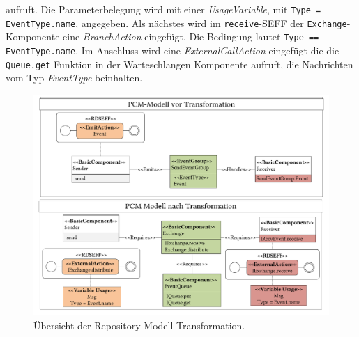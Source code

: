 aufruft. Die Parameterbelegung wird mit einer \emph{UsageVariable}, mit \texttt{Type = EventType.name}, angegeben. Als nächstes wird im \texttt{receive}-SEFF der \texttt{Exchange}-Komponente eine \emph{BranchAction} eingefügt. Die Bedingung lautet \texttt{Type == EventType.name}. Im Anschluss wird eine \emph{ExternalCallAction} eingefügt die die \texttt{Queue.get} Funktion in der Warteschlangen Komponente aufruft, die Nachrichten vom Typ \emph{EventType} beinhalten.

\begin{figure}
\center
  \includegraphics[width=1.3\textwidth, angle=90]{images/transformation/transformationRepository.pdf}
  \caption{Übersicht der Repository-Modell-Transformation.}
  \label{img:transformationRepository}
\end{figure}


